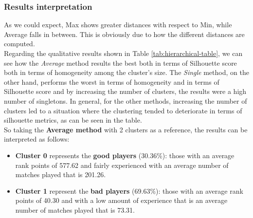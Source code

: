 \subsubsection{Results interpretation}
As we could expect, Max shows greater distances with respect to Min, while Average falls in between. This is obviously due to how the different distances are computed.\\
Regarding the qualitative results shown in Table \ref{tab:hierarchical-table}, we can see how the \textit{Average} method results the best both in terms of Silhouette score both in terms of homogeneity among the cluster's size. The \textit{Single} method, on the other hand, performs the worst in terms of homogeneity and in terms of Silhouette score and by increasing the number of clusters, the results were a high number of singletons. In general, for the other methods, increasing the number of clusters led to a situation where the clustering tended to deteriorate in terms of silhouette metrics, as can be seen in the table.\\
So taking the \textbf{Average method} with 2 clusters as a reference, the results can be interpreted as follows:
\begin{itemize}
	\item{ \textbf{Cluster 0} represents the \textbf{good players} (30.36\%): those with an average rank points of 577.62 and fairly experienced with an average number of matches played that is 201.26.}
	\item{ \textbf{Cluster 1} represent the \textbf{bad players} (69.63\%): those with an average rank points of 40.30 and with a low amount of experience that is an average number of matches played that is 73.31.}
\end{itemize}

